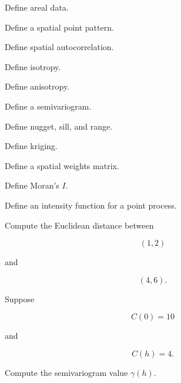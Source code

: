 \begin{exercise}[1]
Define areal data.
\end{exercise}

\begin{exercise}[1]
Define a spatial point pattern.
\end{exercise}

\begin{exercise}[1]
Define spatial autocorrelation.
\end{exercise}

\begin{exercise}[1]
Define isotropy.
\end{exercise}

\begin{exercise}[1]
Define anisotropy.
\end{exercise}

\begin{exercise}[1]
Define a semivariogram.
\end{exercise}

\begin{exercise}[1]
Define nugget, sill, and range.
\end{exercise}

\begin{exercise}[1]
Define kriging.
\end{exercise}

\begin{exercise}[1]
Define a spatial weights matrix.
\end{exercise}

\begin{exercise}[1]
Define Moran's \(I\).
\end{exercise}

\begin{exercise}[1]
Define an intensity function for a point process.
\end{exercise}

\begin{exercise}[2]
Compute the Euclidean distance between

\[
(1,2)
\]

and

\[
(4,6).
\]
\end{exercise}

\begin{exercise}[2]
Suppose

\[
C(0)=10
\]

and

\[
C(h)=4.
\]

Compute the semivariogram value \(\gamma(h)\).
\end{exercise}

